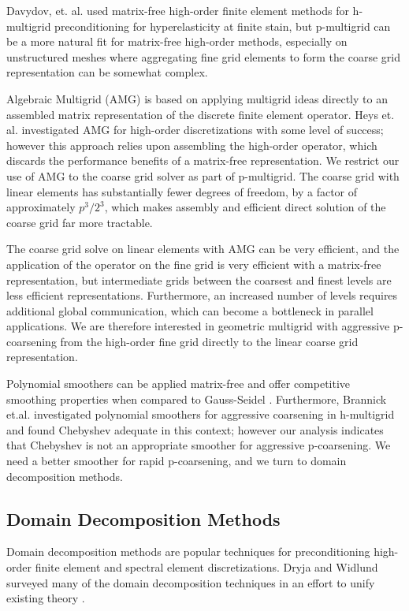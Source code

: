 Davydov, et. al. \cite{davydov2019matrix} used matrix-free high-order finite element methods for h-multigrid preconditioning for hyperelasticity at finite stain, but p-multigrid can be a more natural fit for matrix-free high-order methods, especially on unstructured meshes where aggregating fine grid elements to form the coarse grid representation can be somewhat complex.

Algebraic Multigrid (AMG) is based on applying multigrid ideas directly to an assembled matrix representation of the discrete finite element operator.
Heys et. al. \cite{heys2005algebraic} investigated AMG for high-order discretizations with some level of success; however this approach relies upon assembling the high-order operator, which discards the performance benefits of a matrix-free representation.
We restrict our use of AMG to the coarse grid solver as part of p-multigrid.
The coarse grid with linear elements has substantially fewer degrees of freedom, by a factor of approximately $p^3 / 2^3$, which makes assembly and efficient direct solution of the coarse grid far more tractable.

The coarse grid solve on linear elements with AMG can be very efficient, and the application of the operator on the fine grid is very efficient with a matrix-free representation, but intermediate grids between the coarsest and finest levels are less efficient representations.
Furthermore, an increased number of levels requires additional global communication, which can become a bottleneck in parallel applications.
We are therefore interested in geometric multigrid with aggressive p-coarsening from the high-order fine grid directly to the linear coarse grid representation.

Polynomial smoothers can be applied matrix-free and offer competitive smoothing properties when compared to Gauss-Seidel \cite{adams2003parallel}.
Furthermore, Brannick et.al. \cite{brannick2015polynomial} investigated polynomial smoothers for aggressive coarsening in h-multigrid and found Chebyshev adequate in this context; however our analysis indicates that Chebyshev is not an appropriate smoother for aggressive p-coarsening.
We need a better smoother for rapid p-coarsening, and we turn to domain decomposition methods.

\subsection{Domain Decomposition Methods}

Domain decomposition methods are popular techniques for preconditioning high-order finite element and spectral element discretizations.
Dryja and Widlund surveyed many of the domain decomposition techniques in an effort to unify existing theory \cite{dryja1989towards}.

